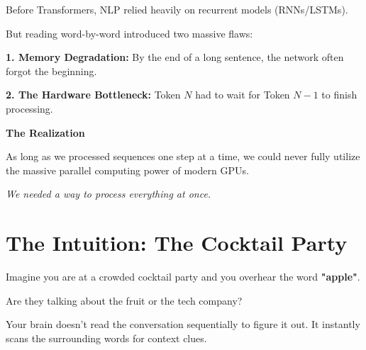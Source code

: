 \documentclass[11pt]{article}
\begin{document}
\vspace{0.3in}

{\large\color{brandgray}
Before Transformers, NLP relied heavily on recurrent models (RNNs/LSTMs).
}

\vspace{0.15in}

But reading word-by-word introduced two massive flaws:

\textbf{1. Memory Degradation:} By the end of a long sentence, the network often forgot the beginning.

\textbf{2. The Hardware Bottleneck:} Token $N$ had to wait for Token $N-1$ to finish processing. 

\vspace{0.15in}

\begin{darkbox}

{\large\textbf{The Realization}}

\vspace{0.05in}

As long as we processed sequences one step at a time, we could never fully utilize the massive parallel computing power of modern GPUs.

\begin{center}
\textit{We needed a way to process everything at once.}
\end{center}

\end{darkbox}

\vfill
\newpage

\section*{The Intuition: The Cocktail Party}

\vspace{0.15in}

Imagine you are at a crowded cocktail party and you overhear the word \textbf{"apple"}.

Are they talking about the fruit or the tech company?

\vspace{0.2in}

Your brain doesn't read the conversation sequentially to figure it out. It instantly scans the surrounding words for context clues.

\vspace{0.2in}
\end{document}
